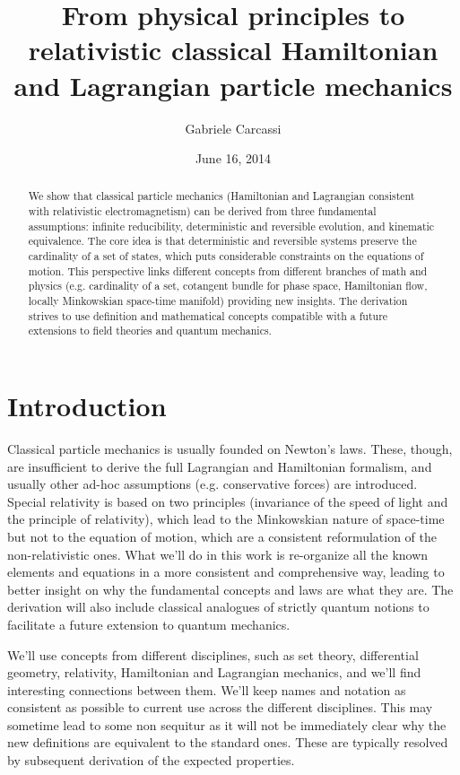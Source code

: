 \documentclass[aps,pra,10pt,twocolumn,floatfix,nofootinbib]{revtex4-1}
\theoremstyle{definition}
\begin{document}
\title{From physical principles to relativistic classical Hamiltonian and Lagrangian particle mechanics}
\author{Gabriele Carcassi}
\date{June 16, 2014}

\begin{abstract}
We show that classical particle mechanics (Hamiltonian and Lagrangian consistent with relativistic electromagnetism) can be derived from three fundamental assumptions: infinite reducibility, deterministic and reversible evolution, and kinematic equivalence. The core idea is that deterministic and reversible systems preserve the cardinality of a set of states, which puts considerable constraints on the equations of motion. This perspective links different concepts from different branches of math and physics (e.g. cardinality of a set, cotangent bundle for phase space, Hamiltonian flow, locally Minkowskian space-time manifold) providing new insights. The derivation strives to use definition and mathematical concepts compatible with a future extensions to field theories and quantum mechanics.\end{abstract}
\maketitle

\section{Introduction}

Classical particle mechanics is usually founded on Newton's laws. These, though, are insufficient to derive the full Lagrangian and Hamiltonian formalism, and usually other ad-hoc assumptions (e.g. conservative forces) are introduced. Special relativity is based on two principles (invariance of the speed of light and the principle of relativity), which lead to the Minkowskian nature of space-time but not to the equation of motion, which are a consistent reformulation of the non-relativistic ones. What we'll do in this work is re-organize all the known elements and equations in a more consistent and comprehensive way, leading to better insight on why the fundamental concepts and laws are what they are. The derivation will also include classical analogues of strictly quantum notions to facilitate a future extension to quantum mechanics.

We'll use concepts from different disciplines, such as set theory, differential geometry, relativity, Hamiltonian and Lagrangian mechanics, and we'll find interesting connections between them. We'll keep names and notation as consistent as possible to current use across the different disciplines. This may sometime lead to some non sequitur as it will not be immediately clear why the new definitions are equivalent to the standard ones. These are typically resolved by subsequent derivation of the expected properties.
\end{document}
